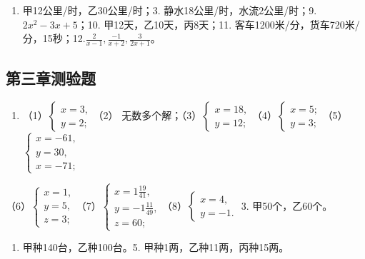 \begin{enumerate}[start=7]
\item
  甲12公里/时，乙30公里/时；3.
  静水18公里/时，水流2公里/时；9.\(2x^{2} - 3x + 5\)；10.
  甲12天，乙10天，丙8天；11.
  客车1200米/分，货车720米/分，15秒；12.\(\frac{2}{x - 1}, \frac{-1}{x + 2}, \frac{3}{2x + 1}\)。
\end{enumerate}

\subsection{第三章测验题}

\begin{enumerate}[start=2]
\item
  （1）\(\left\{ \begin{array}{l} x = 3, \\ y = 2; \end{array} \right.\)（2）
  无数多个解；（3）\(\left\{ \begin{array}{l} x = 18, \\ y = 12; \end{array} \right.\)（4）\(\left\{ \begin{array}{l} x = 5; \\ y = 3; \end{array} \right.\)（5）\(\left\{ \begin{array}{l} x = -61, \\ y = 30, \\ x = -71; \end{array} \right.\)
\end{enumerate}

（6）\(\left\{ \begin{array}{l} x = 1, \\ y = 5, \\ z = 3; \end{array} \right.\)（7）\(\left\{ \begin{array}{l} x = 1\frac{19}{41}, \\ y = -1\frac{11}{49}, \\ z = 60; \end{array} \right.\)（8）\(\left\{ \begin{array}{l} x = 4, \\ y = -1. \end{array} \right.\)
3. 甲50个，乙60个。

\begin{enumerate}[start=4]
\item
  甲种140台，乙种100台。5. 甲种1两，乙种11两，丙种15两。
\end{enumerate}

